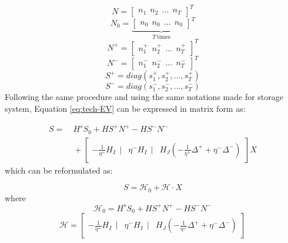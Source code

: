 \begin{equation*}
N = \begin{bmatrix}
n_1~~n_2~~\dots~~n_T
\end{bmatrix}^T
\end{equation*}
\begin{equation*}
N_0 = {\underbrace{\begin{bmatrix}
	n_0~~n_0~~ \dots~~n_0
	\end{bmatrix}}_{T~\text{times}}}^T
\end{equation*}
\begin{equation*}
N^+ = \begin{bmatrix}
n_1^+~~n_2^+~~\dots~~n_T^+
\end{bmatrix}^T
\end{equation*}
\begin{equation*}
N^- = \begin{bmatrix}
n_1^-~~n_2^-~~\dots~~n_T^-
\end{bmatrix}^T
\end{equation*}
\begin{equation*}
S^+ = diag(s_1^+, s_2^+, \dots, s_T^+
)
\end{equation*}
\begin{equation*}
S^- = diag(s_1^-, s_2^-, \dots, s_T^-)
\end{equation*}
\newline
Following the same procedure and using the same notations made for storage system, Equation \eqref{eq:tech-EV} can be expressed in matrix form as:

\begin{equation}
\begin{aligned}
S = &~ H^s S_0 + H S^+ N^+ - H S^- N^- \\
&~+ \begin{bmatrix}
-\frac{1}{\eta^+} H_I~~|& \eta^- H_I~~|& H_J (-\frac{1}{\eta^+} \Delta^{+} + \eta^- \Delta^{-})
\end{bmatrix} X
\end{aligned}
\end{equation}
which can be reformulated as:

\begin{equation}
\label{eq:state-EV-M-1}
S = \mathcal{H}_0 + \mathcal{H} \cdot X
\end{equation}
where
\begin{equation}
\mathcal{H}_0 = H^s S_0 + H S^+ N^+ - H S^- N^-
\end{equation}
\begin{equation}
\label{eq:state-EV-M-3}
\mathcal{H}  = \begin{bmatrix}
-\frac{1}{\eta^+} H_I~~|& \eta^- H_I~~|& H_J (-\frac{1}{\eta^+} \Delta^{+} + \eta^- \Delta^{-})
\end{bmatrix}
\end{equation}
